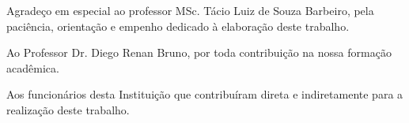 \begin{agradecimentos}[AGRADECIMENTOS]

Agradeço em especial ao professor MSc. Tácio Luiz de Souza Barbeiro, pela paciência, orientação e empenho dedicado à elaboração deste trabalho.

Ao Professor Dr. Diego Renan Bruno, por toda contribuição na nossa formação acadêmica.

Aos funcionários desta Instituição que contribuíram direta e indiretamente para a realização deste trabalho.





\end{agradecimentos}
